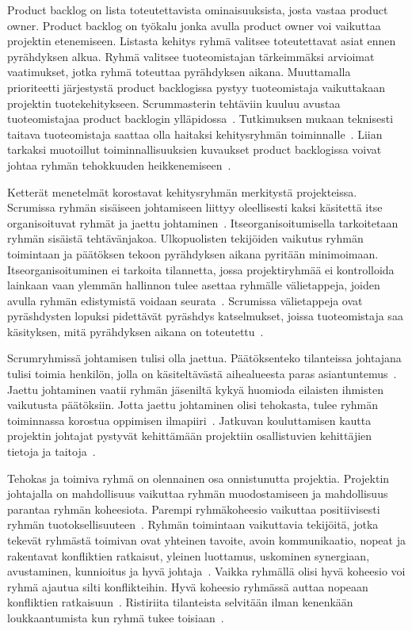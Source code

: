 \documentclass[finnish]{tktltiki2}
\theoremstyle{definition}
\theoremstyle{remark}
\begin{document}
Product backlog on lista toteutettavista ominaisuuksista, josta vastaa product owner. Product backlog on työkalu jonka avulla product owner voi vaikuttaa projektin etenemiseen. Listasta kehitys ryhmä valitsee toteutettavat asiat ennen pyrähdyksen alkua. Ryhmä valitsee tuoteomistajan tärkeimmäksi arvioimat vaatimukset, jotka ryhmä toteuttaa pyrähdyksen aikana. Muuttamalla prioriteetti järjestystä product backlogissa pystyy tuoteomistaja vaikuttakaan projektin tuotekehitykseen. Scrummasterin tehtäviin kuuluu avustaa tuoteomistajaa product backlogin ylläpidossa~\cite{Nerur:2005:CMA:1060710.1060712}. Tutkimuksen mukaan teknisesti taitava tuoteomistaja saattaa olla haitaksi kehitysryhmän toiminnalle~\cite{Nerur:2005:CMA:1060710.1060712}. Liian tarkaksi muotoillut toiminnallisuuksien kuvaukset product backlogissa voivat johtaa ryhmän tehokkuuden heikkenemiseen~\cite{Nerur:2005:CMA:1060710.1060712}.

Ketterät menetelmät korostavat kehitysryhmän merkitystä projekteissa. Scrumissa ryhmän sisäiseen johtamiseen liittyy oleellisesti kaksi käsitettä itse organisoituvat ryhmät ja jaettu johtaminen~\cite{4755768}. Itseorganisoitumisella tarkoitetaan ryhmän sisäistä tehtävänjakoa. Ulkopuolisten tekijöiden vaikutus ryhmän toimintaan ja päätöksen tekoon pyrähdyksen aikana pyritään minimoimaan. Itseorganisoituminen ei tarkoita tilannetta, jossa projektiryhmää ei kontrolloida lainkaan vaan ylemmän hallinnon tulee asettaa ryhmälle välietappeja, joiden avulla ryhmän edistymistä voidaan seurata~\cite{Nerur:2005:CMA:1060710.1060712}. Scrumissa välietappeja ovat pyräshdysten lopuksi pidettävät pyräshdys katselmukset, joissa tuoteomistaja saa käsityksen, mitä pyrähdyksen aikana on toteutettu~\cite{schwaber1995scrum}.

Scrumryhmissä johtamisen tulisi olla jaettua. Päätöksenteko tilanteissa johtajana tulisi toimia henkilön, jolla on käsiteltävästä aihealueesta paras asiantuntemus~\cite{4755768}. Jaettu johtaminen vaatii ryhmän jäseniltä kykyä huomioda eilaisten ihmisten vaikutusta päätöksiin. Jotta jaettu johtaminen olisi tehokasta, tulee ryhmän toiminnassa korostua oppimisen ilmapiiri~\cite{4755768}. Jatkuvan kouluttamisen kautta projektin johtajat pystyvät kehittämään projektiin osallistuvien kehittäjien tietoja ja taitoja~\cite{dall2004project}.

Tehokas ja toimiva ryhmä on olennainen osa onnistunutta projektia. Projektin johtajalla on mahdollisuus vaikuttaa ryhmän muodostamiseen ja mahdollisuus parantaa ryhmän koheesiota. Parempi ryhmäkoheesio vaikuttaa positiivisesti ryhmän tuotoksellisuuteen~\cite{bahli2005group, McLeod:2011:FAS:1978802.1978803}. Ryhmän toimintaan vaikuttavia tekijöitä, jotka tekevät ryhmästä toimivan ovat yhteinen tavoite, avoin kommunikaatio, nopeat ja rakentavat konfliktien ratkaisut, yleinen luottamus, uskominen synergiaan, avustaminen, kunnioitus ja hyvä johtaja~\cite{4017705}. Vaikka ryhmällä olisi hyvä koheesio voi ryhmä ajautua silti konflikteihin. Hyvä koheesio ryhmässä auttaa nopeaan konfliktien ratkaisuun~\cite{bradley1997effect}. Ristiriita tilanteista selvitään ilman kenenkään loukkaantumista kun ryhmä tukee toisiaan~\cite{bradley1997effect}.
\end{document}

